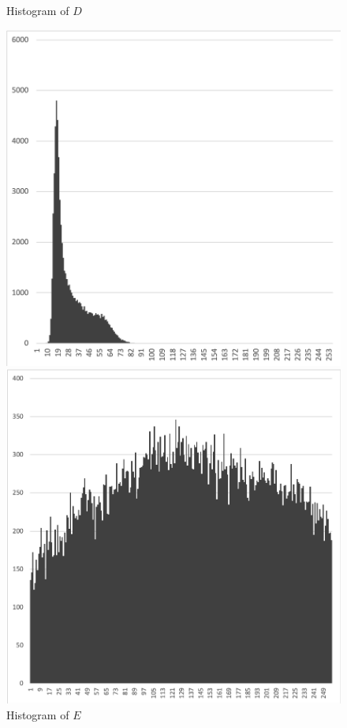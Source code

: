 \documentclass[12pt,a4paper,notitlepage,oneside,amsmath,amssymb]{article}
\begin{document}
\begin{CJK*}{UTF8}{bkai}
\begin{enumerate}[label=(\alph*)]
\begin{figure}[hbt!]
\begin{minipage}{.25\textwidth}
              \caption*{Histogram of \(D\)}
            \end{minipage}%
            \begin{minipage}{.25\textwidth}
              \centering
              \includegraphics[width=.95\linewidth]{hist_E}
              \caption*{Histogram of \(E\)}
            \end{minipage}%
            \begin{minipage}{.25\textwidth}
              \centering
              \includegraphics[width=.95\linewidth]{hist_LD}

\end{minipage}
\end{figure}
\end{enumerate}
\end{CJK*}
\end{document}
